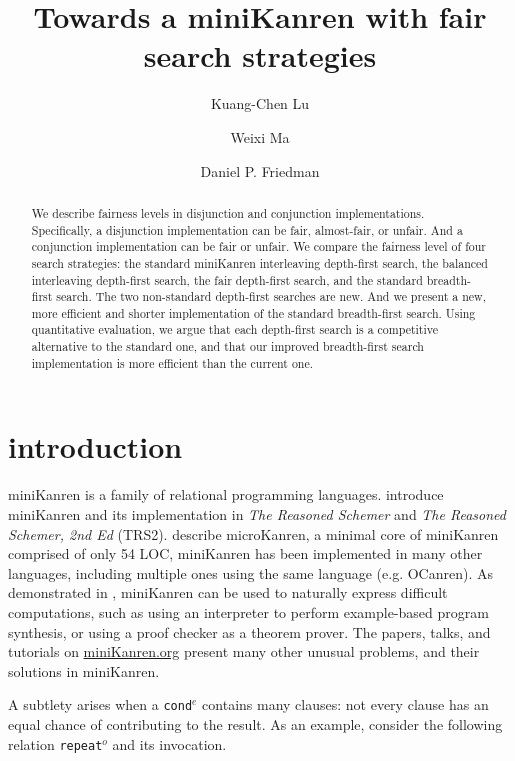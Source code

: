 \documentclass[acmlarge]{acmart}
\title{Towards a miniKanren with fair search strategies}
\author{Kuang-Chen Lu}
\affiliation{%
  \institution{Indiana University}
  \country{USA}}
\author{Weixi Ma}
\affiliation{%
  \institution{Indiana University}
  \country{USA}}
\author{Daniel P. Friedman}
\affiliation{%
  \institution{Indiana University}
  \country{USA}}
\newcommand{\conde}{\texttt{cond$^e$}}
\newcommand{\repeato}{\texttt{repeat$^o$}}
\begin{document}
\begin{abstract}

We describe fairness levels in disjunction and conjunction
implementations. Specifically, a disjunction implementation can be
fair, almost-fair, or unfair. And a conjunction implementation can be
fair or unfair. We compare the fairness level of four search
strategies: the standard miniKanren interleaving depth-first search,
the balanced interleaving depth-first search, the fair depth-first
search, and the standard breadth-first search.  The two non-standard
depth-first searches are new. And we present a new, more efficient
and shorter implementation of the standard breadth-first search.
Using quantitative evaluation, we argue that each depth-first search is a
competitive alternative to the standard one, and that our improved 
breadth-first search implementation is more efficient than the
current one.

\end{abstract}

\maketitle
\thispagestyle{empty}

\section{introduction}

miniKanren is a family of relational programming languages.
\citet{Friedman:2005:RS:1121583,friedman_reasoned_2018} introduce
miniKanren and its implementation in \emph{The Reasoned Schemer} 
and \emph{The Reasoned Schemer, 2nd Ed} (TRS2). \mbox{\citet{Hemann_2016}}
describe microKanren, a minimal core of miniKanren comprised of only 54 LOC, 
miniKanren has been implemented in many other languages, including
multiple ones using the same language (e.g. OCanren\citep{kosarev2018typed}). 
As demonstrated in \citet{byrd2017unified}, miniKanren can be used to
naturally express difficult computations, such as using an interpreter
to perform example-based program synthesis, or using a proof checker
as a theorem prover.
The papers, talks, and tutorials on \url{miniKanren.org} present many
other unusual problems, and their solutions in miniKanren.

A subtlety arises 
when a \conde{} contains many clauses: not every clause has an 
equal chance of contributing to the result. As an example, consider the 
following 
relation \repeato{} and its invocation. 
\end{document}
